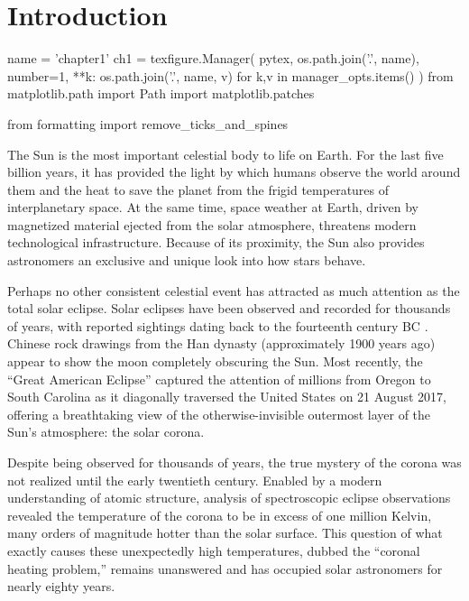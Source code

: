 \chapter{Introduction}\label{ch:introduction}

\begin{pycode}[chapter1]
name = 'chapter1'
ch1 = texfigure.Manager(
    pytex,
    os.path.join('.', name),
    number=1,
    **{k: os.path.join('.', name, v) for k,v in manager_opts.items()}
)
from matplotlib.path import Path
import matplotlib.patches

from formatting import remove_ticks_and_spines
\end{pycode}

The Sun is the most important celestial body to life on Earth. For the last five billion years, it has provided the light by which humans observe the world around them and the heat to save the planet from the frigid temperatures of interplanetary space. At the same time, space weather at Earth, driven by magnetized material ejected from the solar atmosphere, threatens modern technological infrastructure. Because of its proximity, the Sun also provides astronomers an exclusive and unique look into how stars behave. 

Perhaps no other consistent celestial event has attracted as much attention as the total solar eclipse. Solar eclipses have been observed and recorded for thousands of years, with reported sightings dating back to the fourteenth century BC \citep{golub_solar_2010}. Chinese rock drawings from the Han dynasty (approximately 1900 years ago) appear to show the moon completely obscuring the Sun. Most recently, the ``Great American Eclipse'' captured the attention of millions from Oregon to South Carolina as it diagonally traversed the United States on 21 August 2017, offering a breathtaking view of the otherwise-invisible outermost layer of the Sun's atmosphere: the solar corona.

Despite being observed for thousands of years, the true mystery of the corona was not realized until the early twentieth century. Enabled by a modern understanding of atomic structure, analysis of spectroscopic eclipse observations revealed the temperature of the corona to be in excess of one million Kelvin, many orders of magnitude hotter than the solar surface. This question of what exactly causes these unexpectedly high temperatures, dubbed the ``coronal heating problem,'' remains unanswered and has occupied solar astronomers for nearly eighty years. 

